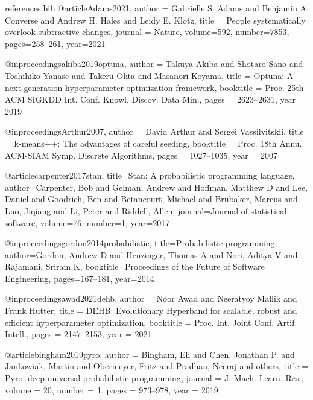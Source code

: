 \documentclass[runningheads]{llncs}
\begin{document}
\begin{filecontents}{references.bib}
@article{Adams2021,
  author  = {Gabrielle S. Adams and Benjamin A. Converse and Andrew H. Hales and Leidy E. Klotz},
  title   = {People systematically overlook subtractive changes},
  journal = {Nature}, volume={592}, number={7853}, pages={258--261}, year={2021}
}

@inproceedings{akiba2019optuna,
  author    = {Takuya Akiba and Shotaro Sano and Toshihiko Yanase and Takeru Ohta and Masanori Koyama},
  title     = {Optuna: A next-generation hyperparameter optimization framework},
  booktitle = {Proc. 25th ACM SIGKDD Int. Conf. Knowl. Discov. Data Min.},
  pages     = {2623--2631},
  year      = {2019}
}



@inproceedings{Arthur2007,
  author    = {David Arthur and Sergei Vassilvitskii},
  title     = {{k}-means++: The advantages of careful seeding},
  booktitle = {Proc. 18th Annu. ACM-SIAM Symp. Discrete Algorithms},
  pages     = {1027--1035},
  year      = {2007}
}

@article{carpenter2017stan,
  title={Stan: A probabilistic programming language},
  author={Carpenter, Bob and Gelman, Andrew and Hoffman, Matthew D and Lee, Daniel and Goodrich, Ben and Betancourt, Michael and Brubaker, Marcus and Luo, Jiqiang and Li, Peter and Riddell, Allen},
  journal={Journal of statistical software},
  volume={76},
  number={1},
  year={2017}
}

@inproceedings{gordon2014probabilistic,
  title={Probabilistic programming},
  author={Gordon, Andrew D and Henzinger, Thomas A and Nori, Aditya V and Rajamani, Sriram K},
  booktitle={Proceedings of the Future of Software Engineering},
  pages={167--181},
  year={2014}
}

@inproceedings{awad2021dehb,
  author    = {Noor Awad and Neeratyoy Mallik and Frank Hutter},
  title     = {DEHB: Evolutionary Hyperband for scalable, robust and efficient hyperparameter optimization},
  booktitle = {Proc. Int. Joint Conf. Artif. Intell.},
  pages     = {2147--2153},
  year      = {2021}
}


@article{bingham2019pyro,
  author = {Bingham, Eli and Chen, Jonathan P. and Jankowiak, Martin and Obermeyer, Fritz and Pradhan, Neeraj and others},
  title = {Pyro: deep universal probabilistic programming},
  journal = {J. Mach. Learn. Res.},
  volume = {20},
  number = {1},
  pages = {973--978},
  year = {2019}
}


\end{filecontents}
\end{document}
